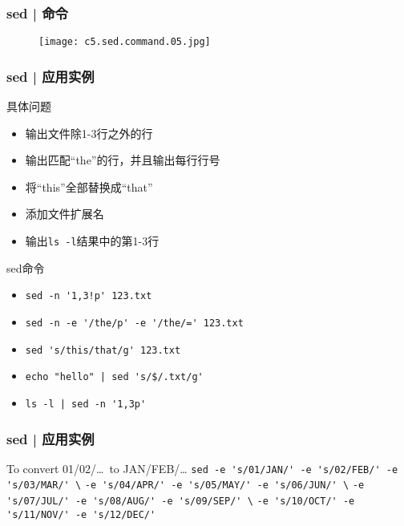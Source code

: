 \begin{frame}
  \frametitle{sed | 命令}
  \begin{figure}
    \centering
    \texttt{[image: c5.sed.command.05.jpg]}
  \end{figure}
\end{frame}

\begin{frame}[fragile]
  \frametitle{sed | \alert{应用实例}}
  \begin{block}{具体问题}
    \begin{itemize}
      \item<2-> 输出文件除1-3行之外的行 
      \item<4-> 输出匹配“the”的行，并且输出每行行号
      \item<6-> 将“this”全部替换成“that”
      \item<8-> 添加文件扩展名
      \item<10-> 输出\verb|ls -l|结果中的第1-3行
    \end{itemize}
  \end{block}
  \begin{block}{sed命令}
    \begin{itemize}
      \item<3-> \verb|sed -n '1,3!p' 123.txt|
      \item<5-> \verb|sed -n -e '/the/p' -e '/the/=' 123.txt|
      \item<7-> \verb|sed 's/this/that/g' 123.txt|
      \item<9-> \verb=echo "hello" | sed 's/$/.txt/g'=
      \item<11-> \verb=ls -l | sed -n '1,3p'=
    \end{itemize}
  \end{block}
\end{frame}

\begin{frame}[fragile]
  \frametitle{sed | 应用实例}
  \begin{block}{To convert 01/02/\ldots \ to JAN/FEB/\ldots}
    \verb|sed -e 's/01/JAN/' -e 's/02/FEB/' -e 's/03/MAR/' \|
    \verb|-e 's/04/APR/' -e 's/05/MAY/' -e 's/06/JUN/' \|
    \verb|-e 's/07/JUL/' -e 's/08/AUG/' -e 's/09/SEP/' \|
    \verb|-e 's/10/OCT/' -e 's/11/NOV/' -e 's/12/DEC/'|
  \end{block}
\end{frame}

